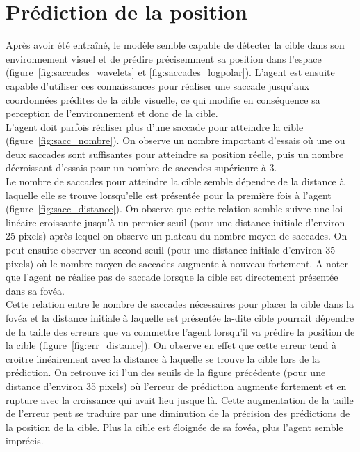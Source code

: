 \section{Prédiction de la position}

Après avoir été entraîné, le modèle semble capable de détecter la cible dans son environnement visuel et de prédire précisemment sa position dans l'espace (figure~\ref{fig:saccades_wavelets} et \ref{fig:saccades_logpolar}). L'agent est ensuite capable d'utiliser ces connaissances pour réaliser une saccade jusqu'aux coordonnées prédites de la cible visuelle, ce qui modifie en conséquence sa perception de l'environnement et donc de la cible.\\

L'agent doit parfois réaliser plus d'une saccade pour atteindre la cible (figure~\ref{fig:sacc_nombre}). On observe un nombre important d'essais où une ou deux saccades sont suffisantes pour atteindre sa position réelle, puis un nombre décroissant d'essais pour un nombre de saccades supérieure à 3. \\
Le nombre de saccades pour atteindre la cible semble dépendre de la distance à laquelle elle se trouve lorsqu'elle est présentée pour la première fois à l'agent (figure~\ref{fig:sacc_distance}). On observe que cette relation semble suivre une loi linéaire croissante jusqu'à un premier seuil (pour une distance initiale d'environ 25 pixels) après lequel on observe un plateau du nombre moyen de saccades. On peut ensuite observer un second seuil (pour une distance initiale d'environ 35 pixels) où le nombre moyen de saccades augmente à nouveau fortement. A noter que l'agent ne réalise pas de saccade lorsque la cible est directement présentée dans sa fovéa.\\
Cette relation entre le nombre de saccades nécessaires pour placer la cible dans la fovéa et la distance initiale à laquelle est présentée la-dite cible pourrait dépendre de la taille des erreurs que va commettre l'agent lorsqu'il va prédire la position de la cible (figure~\ref{fig:err_distance}). On observe en effet que cette erreur tend à croitre linéairement avec la distance à laquelle se trouve la cible lors de la prédiction. On retrouve ici l'un des seuils de la figure précédente (pour une distance d'environ 35 pixels) où l'erreur de prédiction augmente fortement et en rupture avec la croissance qui avait lieu jusque là. Cette augmentation de la taille de l'erreur peut se traduire par une diminution de la précision des prédictions de la position de la cible. Plus la cible est éloignée de sa fovéa, plus l'agent semble imprécis.\\



